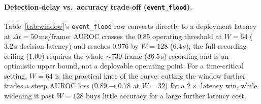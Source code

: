 ﻿\documentclass{article} %
\theoremstyle{remark}
\begin{document}
\begin{table}[t]
  \centering\small
  \caption{Fused MDD AUROC vs.\ aggregation window $W$ (frames) at severity~5. $W=1$ is
  per-frame, ``full'' is whole-recording; the $W{=}64$ point estimate is not repeated here
  since it already appears in Table~\ref{tab:mdd-w64}(b) -- only its CI is new information.}
  \label{tab:window}
\end{table}

\paragraph{Detection-delay vs.\ accuracy trade-off (\texttt{event\_flood}).} Table~\ref{tab:window}'s
\texttt{event\_flood} row converts directly to a deployment latency at $\Delta t{=}50$\,ms/frame:
AUROC crosses the $0.85$ operating threshold at $W{=}64$ ($3.2$\,s decision latency) and reaches
$0.976$ by $W{=}128$ ($6.4$\,s); the full-recording ceiling ($1.00$) requires the whole
${\sim}730$-frame ($36.5$\,s) recording and is an optimistic upper bound, not a deployable operating
point. For a time-critical setting, $W{=}64$ is the practical knee of the curve: cutting the window
further trades a steep AUROC loss ($0.89\to0.78$ at $W{=}32$) for a $2\times$ latency win, while
widening it past $W{=}128$ buys little accuracy for a large further latency cost.
\end{document}

